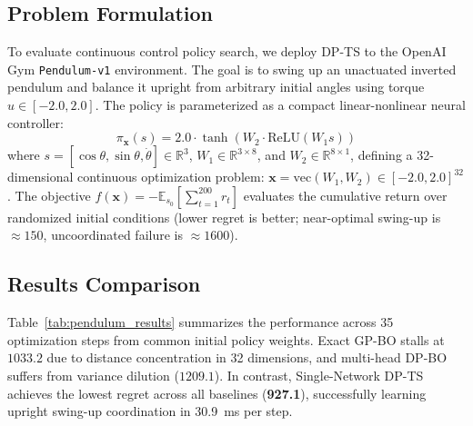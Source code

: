 \documentclass{article}
\begin{document}
\subsection{Problem Formulation}
To evaluate continuous control policy search, we deploy DP-TS to the OpenAI Gym \texttt{Pendulum-v1} environment. The goal is to swing up an unactuated inverted pendulum and balance it upright from arbitrary initial angles using torque $u \in [-2.0, 2.0]$. The policy is parameterized as a compact linear-nonlinear neural controller:
\begin{equation}
\pi_\mathbf{x}(s) = 2.0 \cdot \tanh(W_2 \cdot \mathrm{ReLU}(W_1 s))
\end{equation}
where $s = [\cos\theta, \sin\theta, \dot{\theta}] \in \mathbb{R}^3$, $W_1 \in \mathbb{R}^{3 \times 8}$, and $W_2 \in \mathbb{R}^{8 \times 1}$, defining a 32-dimensional continuous optimization problem: $\mathbf{x} = \mathrm{vec}(W_1, W_2) \in [-2.0, 2.0]^{32}$. The objective $f(\mathbf{x}) = -\mathbb{E}_{s_0}[\sum_{t=1}^{200} r_t]$ evaluates the cumulative return over randomized initial conditions (lower regret is better; near-optimal swing-up is $\approx 150$, uncoordinated failure is $\approx 1600$).

\subsection{Results Comparison}
Table~\ref{tab:pendulum_results} summarizes the performance across 35 optimization steps from common initial policy weights. Exact GP-BO stalls at $1033.2$ due to distance concentration in 32 dimensions, and multi-head DP-BO suffers from variance dilution ($1209.1$). In contrast, Single-Network DP-TS achieves the lowest regret across all baselines (\textbf{927.1}), successfully learning upright swing-up coordination in 30.9~ms per step.

\begin{table}[h]
\centering
\caption{\textbf{Quantitative Results on 32-Dimensional Policy Optimization (Pendulum-v1).}}
\label{tab:pendulum_results}
\vspace{1mm}
\end{table}
\end{document}
